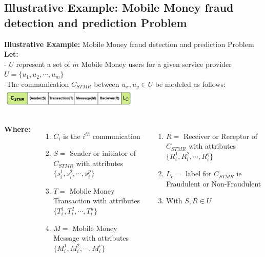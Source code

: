 \documentclass[11pt,aspectratio=169]{beamer}
\begin{document}
		\subsection{\tiny{Illustrative Example: Mobile Money fraud detection and prediction Problem}}
		\begin{frame}{\normalsize{{\textbf{Illustrative Example:} Mobile Money fraud detection and prediction Problem}}}
			\small
			\textbf{Let:}\\ 
			- $U$ represent a set of \textbf{$m$} Mobile Money users for a given service provider \centering  $U=\{u_1,u_2,\cdots,u_m \}$\\
			
			-The communication $C_{STMR}$ between $u_x, u_y \in U$ be modeled as follows:
			\includegraphics[width=0.5\textwidth]{./assets/model.png}
			
				\begin{columns}
				\textbf{Where:}\\
				\footnotesize{
				\begin{enumerate}[-]
					\item $C_i$ is the $i^{th}$ communication
					\item $S =$ Sender or initiator of $C_{STMR}$ with attributes $\{s_i^1,s_i^2,\cdots,s_i^p \}$\\
					\item  $T = $ Mobile Money Transaction  with attributes $\{T_i^1,T_i^2,\cdots,T_i^u \}$\\
					\item $M = $ Mobile Money Message  with attributes $\{M_i^1,M_i^2,\cdots,M_i^v \}$\\
				\end{enumerate}
				 
				}
						
						
				
					\footnotesize{
					\begin{enumerate}[-]
					\item $R = $ Receiver or Receptor of $C_{STMR}$ with attributes $\{R_i^1,R_i^2,\cdots,R_i^q \}$\\
					\item $L_c = $ label for $C_{STMR}$ ie Fraudulent or Non-Fraudulent\\
					\item With $S,R \in U$
				\end{enumerate}
			}
	
				\end{columns}
				
			
						
		\end{frame}	
	
\end{document}
